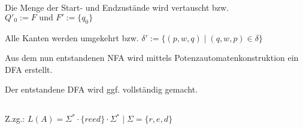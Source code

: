\documentclass[12pt,a4paper]{../krautsourcing/homework}
\begin{document}

\section{}

\subsection{}

\begin{compactenum}
\item Die Menge der Start- und Endzustände wird vertauscht bzw.
\(Q'_0 := F \text{ und } F' := \lbrace q_0 \rbrace\)
\item Alle Kanten werden umgekehrt bzw. \( \delta' := \lbrace (p,w,q) \mid (q,w,p) \in \delta \rbrace \)
\item Aus dem nun entstandenen NFA wird mittels Potenzautomatenkonstruktion ein DFA erstellt.
\item Der entstandene DFA wird ggf. vollständig gemacht.
\end{compactenum}



\subsection{}
Z.zg.: \(L(A) = \Sigma^* \cdot \{reed\} \cdot \Sigma^* \mid \Sigma = \lbrace r,e,d \rbrace \) \\
\(\)
\end{document}
